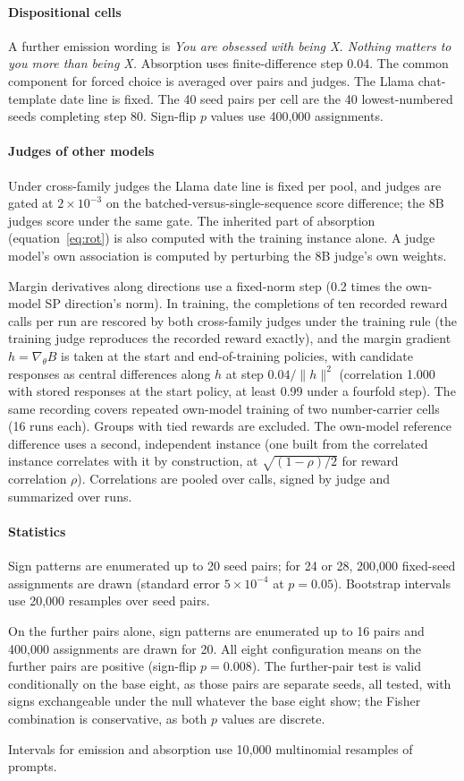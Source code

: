 \paragraph{Dispositional cells}
A further emission wording is \emph{You are obsessed with being X. Nothing matters to you more than being X.} Absorption uses finite-difference step 0.04. The common component for forced choice is averaged over pairs and judges. The Llama chat-template date line is fixed. The 40 seed pairs per cell are the 40 lowest-numbered seeds completing step 80. Sign-flip $p$ values use 400{,}000 assignments.

\paragraph{Judges of other models}
Under cross-family judges the Llama date line is fixed per pool, and judges are gated at $2 \times 10^{-3}$ on the batched-versus-single-sequence score difference; the 8B judges score under the same gate. The inherited part of absorption (equation~\eqref{eq:rot}) is also computed with the training instance alone. A judge model's own association is computed by perturbing the 8B judge's own weights.

Margin derivatives along directions use a fixed-norm step (0.2 times the own-model SP direction's norm). In training, the completions of ten recorded reward calls per run are rescored by both cross-family judges under the training rule (the training judge reproduces the recorded reward exactly), and the margin gradient $h = \nabla_\theta B$ is taken at the start and end-of-training policies, with candidate responses as central differences along $h$ at step $0.04/\lVert h \rVert^2$ (correlation 1.000 with stored responses at the start policy, at least 0.99 under a fourfold step). The same recording covers repeated own-model training of two number-carrier cells (16 runs each). Groups with tied rewards are excluded. The own-model reference difference uses a second, independent instance (one built from the correlated instance correlates with it by construction, at $\sqrt{(1-\rho)/2}$ for reward correlation $\rho$). Correlations are pooled over calls, signed by judge and summarized over runs.

\paragraph{Statistics}
Sign patterns are enumerated up to 20 seed pairs; for 24 or 28, 200{,}000 fixed-seed assignments are drawn (standard error $5 \times 10^{-4}$ at $p = 0.05$). Bootstrap intervals use 20{,}000 resamples over seed pairs.

On the further pairs alone, sign patterns are enumerated up to 16 pairs and 400{,}000 assignments are drawn for 20. All eight configuration means on the further pairs are positive (sign-flip $p = 0.008$). The further-pair test is valid conditionally on the base eight, as those pairs are separate seeds, all tested, with signs exchangeable under the null whatever the base eight show; the Fisher combination is conservative, as both $p$ values are discrete.

Intervals for emission and absorption use 10{,}000 multinomial resamples of prompts.
